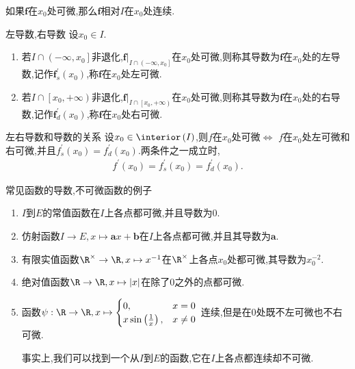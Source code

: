 \begin{remark}{}{}
	如果$\mathbf{f}$在$x_{0}$处可微,那么$\mathbf{f}$相对$I$在$x_{0}$处连续.
\end{remark}

\begin{definition}{左导数,右导数}{}
	设$x_{0}\in I$.
	\begin{enumerate}
		\item 若$I\cap\left(-\infty,x_{0}\right]$非退化,$\mathbf{f}|_{I\cap\left(-\infty,x_{0}\right]}$在$x_{0}$处可微,则称其导数为$\mathbf{f}$在$x_{0}$处的左导数,记作$\mathbf{f}_{s}^{\prime}\left(x_{0}\right)$,称$\mathbf{f}$在$x_{0}$处左可微.
		\item 若$I\cap\left[x_{0},+\infty\right)$非退化,$\mathbf{f}|_{I\cap\left[x_{0},+\infty\right)}$在$x_{0}$处可微,则称其导数为$\mathbf{f}$在$x_{0}$处的右导数,记作$\mathbf{f}_{d}^{\prime}\left(x_{0}\right)$,称$\mathbf{f}$在$x_{0}$处右可微.
	\end{enumerate}
\end{definition}

\begin{proposition}{左右导数和导数的关系}{}
	设$x_{0}\in\interior\left(I\right)$,则$f$在$x_{0}$处可微$\iff$ $f$在$x_{0}$处左可微和右可微,并且$f_{s}^{\prime}\left(x_{0}\right)=f_{d}^{\prime}\left(x_{0}\right)$.两条件之一成立时,
	\begin{align*}
		f^{\prime}\left(x_{0}\right)=f_{s}^{\prime}\left(x_{0}\right)=f_{d}^{\prime}\left(x_{0}\right).
	\end{align*}
\end{proposition}

\begin{example}{常见函数的导数,不可微函数的例子}{}
	\begin{enumerate}
		\item $I$到$E$的常值函数在$I$上各点都可微,并且导数为$0$.
		\item 仿射函数$I\to E,x\mapsto \mathbf{a}x+\mathbf{b}$在$I$上各点都可微,并且其导数为$\mathbf{a}$.
		\item 有限实值函数$\R^{\times}\to\R,x\mapsto x^{-1}$在$\R^{\times}$上各点$x_{0}$处都可微,其导数为$x_{0}^{-2}$.
		\item 绝对值函数$\R\to\R,x\mapsto\left|x\right|$在除了$0$之外的点都可微.
		\item 函数$\psi:\R\to\R,x\mapsto
		\begin{cases}
			0,&x=0\\
			x\sin\left(\frac{1}{x}\right),&x\neq 0
		\end{cases}$
		连续,但是在$0$处既不左可微也不右可微.
		
		事实上,我们可以找到一个从$I$到$E$的函数,它在$I$上各点都连续却不可微.
	\end{enumerate}
\end{example}

